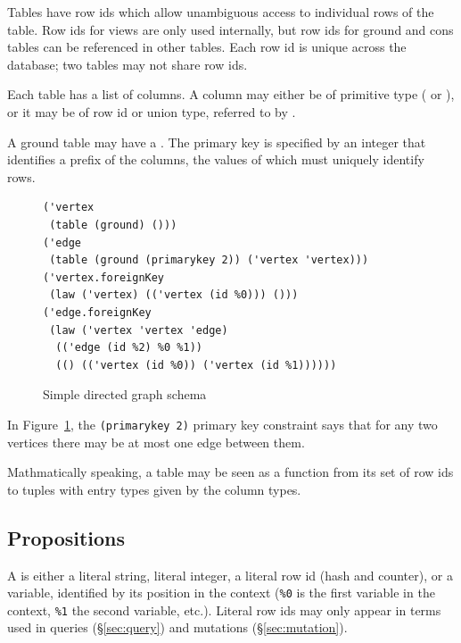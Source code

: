 \documentclass{scrartcl}
\begin{document}
Tables have row ids which allow unambiguous access to individual rows of the table. Row ids for views are only used internally, but row ids for ground and cons tables can be referenced in other tables. Each row id is unique across the database; two tables may not share row ids.

Each table has a list of columns. A column may either be of primitive type ( or ), or it may be of row id or union type, referred to by .

\begin{definition} \label{def:primary-key}
  A ground table may have a . The primary key is specified by an integer that identifies a prefix of the columns, the values of which must uniquely identify rows.
\end{definition}

\begin{figure}
\begin{verbatim}
('vertex
 (table (ground) ()))
('edge
 (table (ground (primarykey 2)) ('vertex 'vertex)))
('vertex.foreignKey
 (law ('vertex) (('vertex (id %0))) ()))
('edge.foreignKey
 (law ('vertex 'vertex 'edge)
  (('edge (id %2) %0 %1))
  (() (('vertex (id %0)) ('vertex (id %1))))))
\end{verbatim}
  \caption{Simple directed graph schema}
  \label{fig:simple-digraph}
\end{figure}

\begin{example}
  In Figure~\ref{fig:simple-digraph}, the \verb|(primarykey 2)| primary key constraint says that for any two vertices there may be at most one edge between them.
\end{example}

Mathmatically speaking, a table may be seen as a function from its set of row ids to tuples with entry types given by the column types.

\subsection{Propositions} \label{sec:propositions}

\begin{definition} \label{def:term}
  A  is either a literal string, literal integer, a literal row id (hash and counter), or a variable, identified by its position in the context (\verb|%0| is the first variable in the context, \verb|%1| the second variable, etc.). Literal row ids may only appear in terms used in queries (\S\ref{sec:query}) and mutations (\S\ref{sec:mutation}).
\end{definition}
\end{document}
